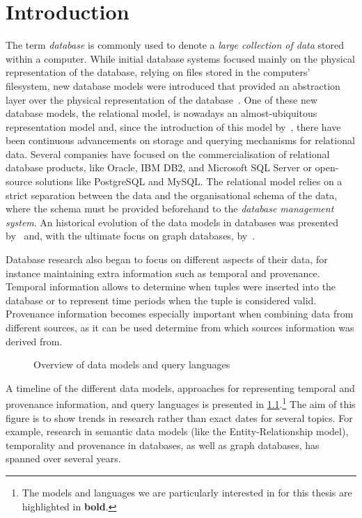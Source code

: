 \chapter{Introduction}
\label{cha:introduction}
%
The term \emph{database} is commonly used to denote a \emph{large collection of data} stored within a
computer. 
%
While initial database systems focused mainly on the physical representation of the database, relying on files stored in
the computers' filesystem, new database models were introduced that provided an abstraction layer over the physical
representation of the database~\cite{AbiteboulHullVianu:1995aa,SilberschatzKorthSudarshan:2005aa}.
%
One of these new database models, the relational model, is nowadays an almost-ubiquitous representation model and, since
the introduction of this model by~\citet{Codd:1970aa}, there have been continuous advancements on storage and querying
mechanisms for relational data.
%
Several companies have focused on the commercialisation of relational database products, like Oracle, IBM DB2,
and Microsoft SQL Server or open-source solutions like PostgreSQL and MySQL.
%
The relational model relies on a strict separation between the data and the organisational schema of the data, where the
schema must be provided beforehand to the \emph{database management system}.  An historical evolution of the data models
in databases was presented by~\citet{Navathe:1992aa} and, with the ultimate focus on graph databases,
by~\citet{AnglesGutierrez:2008ab}.

Database research also began to focus on different aspects of their data, for instance maintaining extra information
such as temporal and provenance.
%
Temporal information allows to determine when tuples were inserted into the database or to represent time periods when
the tuple is considered valid.
%
Provenance information becomes especially important when combining data from different sources, as it can be used
determine from which sources information was derived from.


\begin{figure}[t]
  \centering
  \begin{scaletikzpicturetowidth}{\textwidth}
    
  \end{scaletikzpicturetowidth}
  \caption{Overview of data models and query languages}
  \label{fig:overview-dm-ql}
\end{figure}
%
A timeline of the different data models, approaches for representing temporal and provenance information, and query
languages is presented in \cref{fig:overview-dm-ql}.\footnote{The models and languages we are particularly interested in
  for this thesis are highlighted in \textbf{bold}.}
%
The aim of this figure is to show trends in research rather than exact dates for several topics.  For example, research
in semantic data models (like the Entity-Relationship model), temporality and provenance in databases, as well as graph
databases, has spanned over several years.



